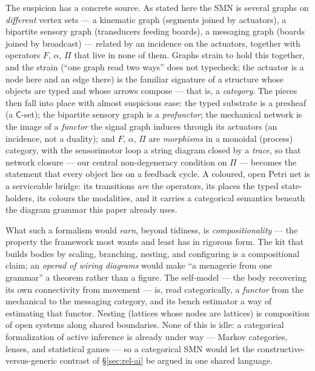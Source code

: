 \documentclass{article}
\begin{document}
The suspicion has a concrete source.  As stated here the SMN is several graphs on
\emph{different} vertex sets --- a kinematic graph (segments joined by actuators), a
bipartite sensory graph (transducers feeding boards), a messaging graph (boards
joined by broadcast) --- related by an incidence on the actuators, together with
operators $F$, $\alpha$, $\Pi$ that live in none of them.  Graphs strain to hold this
together, and the strain (``one graph read two ways'' does not typecheck; the
actuator is a node here and an edge there) is the familiar signature of a structure
whose objects are typed and whose arrows compose --- that is, a \emph{category}.  The
pieces then fall into place with almost suspicious ease: the typed substrate is a
presheaf (a $\mathsf{C}$-set); the bipartite sensory graph is a \emph{profunctor};
the mechanical network is the image of a \emph{functor} the signal graph induces
through its actuators (an incidence, not a duality); and $F$, $\alpha$, $\Pi$ are
\emph{morphisms} in a monoidal (process) category, with the sensorimotor loop a
string diagram closed by a \emph{trace}, so that network closure --- our central
non-degeneracy condition on $\Pi$ --- becomes the statement that every object lies on
a feedback cycle.  A coloured, open Petri net is a serviceable bridge: its
transitions \emph{are} the operators, its places the typed state-holders, its colours
the modalities, and it carries a categorical semantics beneath the diagram grammar
this paper already uses.

What such a formalism would \emph{earn}, beyond tidiness, is \emph{compositionality}
--- the property the framework most wants and least has in rigorous form.  The kit
that builds bodies by scaling, branching, nesting, and configuring is a compositional
claim; an \emph{operad of wiring diagrams} would make ``a menagerie from one
grammar'' a theorem rather than a figure.  The self-model --- the body recovering its
own connectivity from movement --- is, read categorically, a \emph{functor} from the
mechanical to the messaging category, and its bench estimator a way of estimating
that functor.  Nesting (lattices whose nodes are lattices) is composition of open
systems along shared boundaries.  None of this is idle: a categorical formalization
of active inference is already under way --- Markov categories, lenses, and
statistical games \citep{StClereSmithe2023} --- so a categorical SMN would let the
constructive-versus-generic contrast of \S\ref{sec:rel-ai} be argued in one shared
language.
\end{document}
